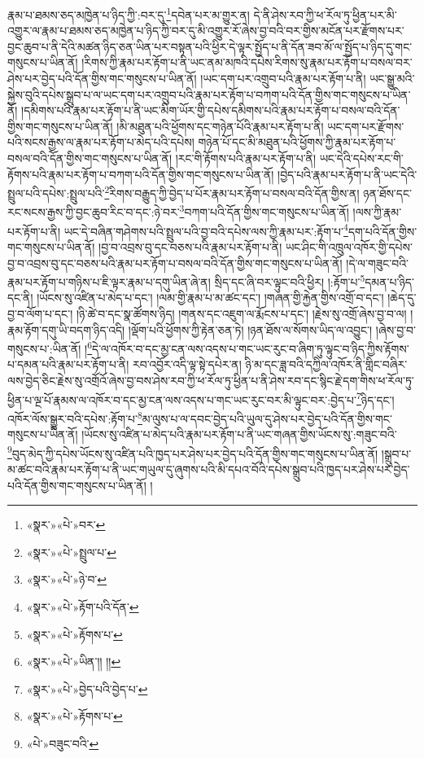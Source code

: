 རྣམ་པ་ཐམས་ཅད་མཁྱེན་པ་ཉིད་ཀྱི་:བར་དུ་\footnote{«སྣར་»«པེ་»བར་}དབེན་པར་མ་གྱུར་ན། དེ་ནི་ཤེས་རབ་ཀྱི་ཕ་རོལ་ཏུ་ཕྱིན་པར་མི་འགྱུར་ལ་རྣམ་པ་ཐམས་ཅད་མཁྱེན་པ་ཉིད་ཀྱི་བར་དུ་མི་འགྱུར་རོ་ཞེས་བྱ་བའི་བར་གྱིས་མངོན་པར་རྫོགས་པར་བྱང་ཆུབ་པ་ནི་དེའི་མཚན་ཉིད་ཅན་ཡིན་པར་བསྟན་པའི་ཕྱིར་དེ་ལྟར་སྤྱོད་པ་ནི་དོན་ཟབ་མོ་ལ་སྤྱོད་པ་ཉིད་དུ་གང་གསུངས་པ་ཡིན་ནོ། །རིགས་ཀྱི་རྣམ་པར་རྟོག་པ་ནི་ཡང་ནམ་མཁའི་དཔེས་རིགས་སུ་རྣམ་པར་རྟོག་པ་བསལ་བར་ཤེས་པར་བྱེད་པའི་དོན་གྱིས་གང་གསུངས་པ་ཡིན་ནོ། །ཡང་དག་པར་འགྲུབ་པའི་རྣམ་པར་རྟོག་པ་ནི། ཡང་སྒྱུ་མའི་སྐྱེས་བུའི་དཔེས་སྒྲུབ་པ་ལ་ཡང་དག་པར་འགྲུབ་པའི་རྣམ་པར་རྟོག་པ་བཀག་པའི་དོན་གྱིས་གང་གསུངས་པ་ཡིན་ནོ། །དམིགས་པའི་རྣམ་པར་རྟོག་པ་ནི་ཡང་མིག་ཡོར་གྱི་དཔེས་དམིགས་པའི་རྣམ་པར་རྟོག་པ་བསལ་བའི་དོན་གྱིས་གང་གསུངས་པ་ཡིན་ནོ། །མི་མཐུན་པའི་ཕྱོགས་དང་གཉེན་པོའི་རྣམ་པར་རྟོག་པ་ནི། ཡང་དག་པར་རྫོགས་པའི་སངས་རྒྱས་ལ་རྣམ་པར་རྟོག་པ་མེད་པའི་དཔེས། གཉེན་པོ་དང་མི་མཐུན་པའི་ཕྱོགས་ཀྱི་རྣམ་པར་རྟོག་པ་བསལ་བའི་དོན་གྱིས་གང་གསུངས་པ་ཡིན་ནོ། །རང་གི་རྟོགས་པའི་རྣམ་པར་རྟོག་པ་ནི། ཡང་དེའི་དཔེས་རང་གི་རྟོགས་པའི་རྣམ་པར་རྟོག་པ་བཀག་པའི་དོན་གྱིས་གང་གསུངས་པ་ཡིན་ནོ། །བྱེད་པའི་རྣམ་པར་རྟོག་པ་ནི་ཡང་དེའི་སྤྲུལ་པའི་དཔེས་:སྤྲུལ་པའི་\footnote{«སྣར་»«པེ་»སྤྲུལ་པ་}རིགས་བརྒྱུད་ཀྱི་བྱེད་པ་པོར་རྣམ་པར་རྟོག་པ་བསལ་བའི་དོན་གྱིས་ན། ཉན་ཐོས་དང་རང་སངས་རྒྱས་ཀྱི་བྱང་ཆུབ་རིང་བ་དང་:ཉེ་བར་\footnote{«སྣར་»«པེ་»ཉེ་བ་}བཀག་པའི་དོན་གྱིས་གང་གསུངས་པ་ཡིན་ནོ། །ལས་ཀྱི་རྣམ་པར་རྟོག་པ་ནི། ཡང་དེ་བཞིན་གཤེགས་པའི་སྤྲུལ་པའི་བྱ་བའི་དཔེས་ལས་ཀྱི་རྣམ་པར་:རྟོག་པ་\footnote{«སྣར་»«པེ་»རྟོག་པའི་དོན་}དག་པའི་དོན་གྱིས་གང་གསུངས་པ་ཡིན་ནོ། །བྱ་བ་འབྲས་བུ་དང་བཅས་པའི་རྣམ་པར་རྟོག་པ་ནི། ཡང་ཤིང་གི་འཁྲུལ་འཁོར་གྱི་དཔེས་བྱ་བ་འབྲས་བུ་དང་བཅས་པའི་རྣམ་པར་རྟོག་པ་བསལ་བའི་དོན་གྱིས་གང་གསུངས་པ་ཡིན་ནོ། །དེ་ལ་གཟུང་བའི་རྣམ་པར་རྟོག་པ་གཉིས་པ་ཇི་ལྟར་རྣམ་པ་དགུ་ཡིན་ཞེ་ན། སྲིད་དང་ཞི་བར་ལྟུང་བའི་ཕྱིར། །:རྟོག་པ་\footnote{«སྣར་»«པེ་»རྟོགས་པ་}དམན་པ་ཉིད་དང་ནི། །ཡོངས་སུ་འཛིན་པ་མེད་པ་དང་། །ལམ་གྱི་རྣམ་པ་མ་ཚང་དང་། །གཞན་གྱི་རྐྱེན་གྱིས་འགྲོ་བ་དང་། །ཆེད་དུ་བྱ་བ་ལོག་པ་དང་། །ཉི་ཚེ་བ་དང་སྣ་ཚོགས་ཉིད། །གནས་དང་འཇུག་ལ་རྨོངས་པ་དང་། །རྗེས་སུ་འགྲོ་ཞེས་བྱ་བ་ལ། །རྣམ་རྟོག་དགུ་ཡི་བདག་ཉིད་འདི། །ལྡོག་པའི་ཕྱོགས་ཀྱི་རྟེན་ཅན་ཏེ། །ཉན་ཐོས་ལ་སོགས་ཡིད་ལ་འབྱུང་། །ཞེས་བྱ་བ་གསུངས་པ་:ཡིན་ནོ། །\footnote{«སྣར་»«པེ་»ཡིན་།། །།}དེ་ལ་འཁོར་བ་དང་མྱ་ངན་ལས་འདས་པ་གང་ཡང་རུང་བ་ཞིག་ཏུ་ལྟུང་བ་ཉིད་ཀྱིས་རྟོགས་པ་དམན་པའི་རྣམ་པར་རྟོག་པ་ནི། རབ་འབྱོར་འདི་ལྟ་སྟེ་དཔེར་ན། ཉི་མ་དང་ཟླ་བའི་དཀྱིལ་འཁོར་ནི་གླིང་བཞིར་ལས་བྱེད་ཅིང་རྗེས་སུ་འགྲོའོ་ཞེས་བྱ་བས་ཤེས་རབ་ཀྱི་ཕ་རོལ་ཏུ་ཕྱིན་པ་ནི་ཤེས་རབ་དང་སྙིང་རྗེ་དག་གིས་ཕ་རོལ་ཏུ་ཕྱིན་པ་ལྔ་པོ་རྣམས་ལ་འཁོར་བ་དང་མྱ་ངན་ལས་འདས་པ་གང་ཡང་རུང་བར་མི་ལྟུང་བར་:བྱེད་པ་\footnote{«སྣར་»«པེ་»བྱེད་པའི་བྱེད་པ་}ཉིད་དང་། འཁོར་ལོས་སྒྱུར་བའི་དཔེས་:རྟོག་པ་\footnote{«སྣར་»«པེ་»རྟོགས་པ་}མ་ལུས་པ་ལ་དབང་བྱེད་པའི་ཡུལ་དུ་ཤེས་པར་བྱེད་པའི་དོན་གྱིས་གང་གསུངས་པ་ཡིན་ནོ། །ཡོངས་སུ་འཛིན་པ་མེད་པའི་རྣམ་པར་རྟོག་པ་ནི་ཡང་གཞན་གྱིས་ཡོངས་སུ་:གཟུང་བའི་\footnote{«པེ་»བཟུང་བའི་}བུད་མེད་ཀྱི་དཔེས་ཡོངས་སུ་འཛིན་པའི་ཁྱད་པར་ཤེས་པར་བྱེད་པའི་དོན་གྱིས་གང་གསུངས་པ་ཡིན་ནོ། །སྒྲུབ་པ་མ་ཚང་བའི་རྣམ་པར་རྟོག་པ་ནི་ཡང་གཡུལ་དུ་ཞུགས་པའི་མི་དཔའ་བོའི་དཔེས་སྒྲུབ་པའི་ཁྱད་པར་ཤེས་པར་བྱེད་པའི་དོན་གྱིས་གང་གསུངས་པ་ཡིན་ནོ། །
